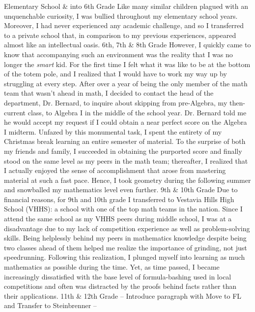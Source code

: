 \documentclass[12pt]{article}
\begin{document}
\begin{outline}[enumerate]
  \1 Elementary School \& into 6th Grade
    \2 Like many similar children plagued with an unquenchable curiosity, I was bullied throughout my elementary school years. Moreover, I had never experienced any academic challenge, and so I transferred to a private school that, in comparison to my previous experiences, appeared almost like an intellectual oasis.
  \1 6th, 7th \& 8th Grade
    \2 However, I quickly came to know that accompanying such an environment was the reality that I was no longer the \emph{smart} kid. For the first time I felt what it was like to be at the bottom of the totem pole, and I realized that I would have to work my way up by struggling at every step.
    \2 After over a year of being the only member of the math team that wasn't ahead in math, I decided to contact the head of the department, Dr. Bernard, to inquire about skipping from pre-Algebra, my then-current class, to Algebra I in the middle of the school year.
    \2 Dr. Bernard told me he would accept my request if I could obtain a near perfect score on the Algebra I midterm.
    Unfazed by this monumental task, I spent the entirety of my Christmas break learning an entire semester of material. To the surprise of both my friends and family, I succeeded in obtaining the purported score and finally stood on the same level as my peers in the math team; thereafter, I realized that I actually enjoyed the sense of accomplishment that arose from mastering material at such a fast pace. Hence, I took geometry during the following summer and snowballed my mathematics level even further.
  \1 9th \& 10th Grade
    \2 Due to financial reasons, for 9th and 10th grade I transferred to Vestavia Hills High School (VHHS): a school with one of the top math teams in the nation. Since I attend the same school as my VHHS peers during middle school, I was at a disadvantage due to my lack of competition experience as well as problem-solving skills. Being helplessly behind my peers in mathematics knowledge despite being two classes ahead of them helped me realize the importance of grinding, not just speedrunning. Following this realization, I plunged myself into learning as much mathematics as possible during the time. Yet, as time passed, I became increasingly dissatisfied with the base level of formula-bashing used in local competitions and often was distracted by the proofs behind facts rather than their applications.
  \1 11th \& 12th Grade
    \2 -- Introduce paragraph with Move to FL and Transfer to Steinbrenner -- %

\end{outline}
\end{document}
